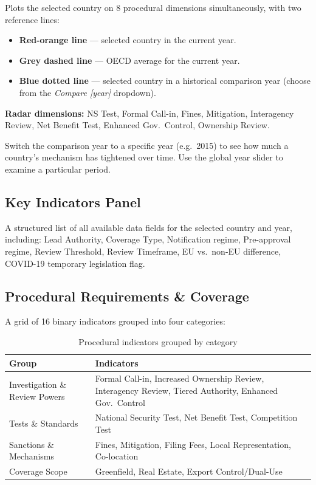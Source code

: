 \documentclass[12pt,a4paper]{article}
\newcommand{\uielem}[1]{\textit{#1}}
\begin{document}
Plots the selected country on 8 procedural dimensions simultaneously, with two reference lines:

\begin{itemize}
  \item \textbf{Red-orange line} — selected country in the current year.
  \item \textbf{Grey dashed line} — OECD average for the current year.
  \item \textbf{Blue dotted line} — selected country in a historical comparison year (choose from the \uielem{Compare [year]} dropdown).
\end{itemize}

\textbf{Radar dimensions:} NS Test, Formal Call-in, Fines, Mitigation, Interagency Review, Net Benefit Test, Enhanced Gov.\ Control, Ownership Review.

\begin{tipbox}
Switch the comparison year to a specific year (e.g.\ 2015) to see how much a country's mechanism has tightened over time. Use the global year slider to examine a particular period.
\end{tipbox}

\subsection{Key Indicators Panel}

A structured list of all available data fields for the selected country and year, including:
Lead Authority, Coverage Type, Notification regime, Pre-approval regime, Review Threshold, Review Timeframe, EU vs.\ non-EU difference, COVID-19 temporary legislation flag.

\subsection{Procedural Requirements \& Coverage}

A grid of 16 binary indicators grouped into four categories:

\begin{table}[h]
\centering
\begin{tabularx}{\linewidth}{lX}
\toprule
\textbf{Group} & \textbf{Indicators} \\
\midrule
Investigation \& Review Powers & Formal Call-in, Increased Ownership Review, Interagency Review, Tiered Authority, Enhanced Gov.\ Control \\
Tests \& Standards & National Security Test, Net Benefit Test, Competition Test \\
Sanctions \& Mechanisms & Fines, Mitigation, Filing Fees, Local Representation, Co-location \\
Coverage Scope & Greenfield, Real Estate, Export Control/Dual-Use \\
\bottomrule
\end{tabularx}
\caption{Procedural indicators grouped by category}
\end{table}
\end{document}
